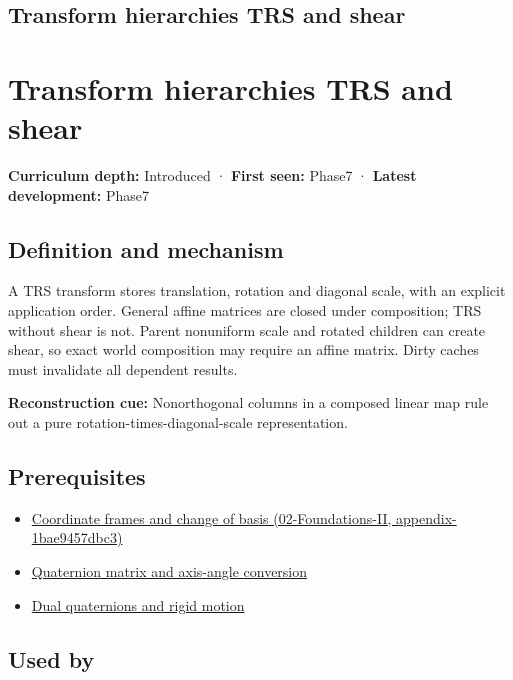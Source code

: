 \hypertarget{appendix-292c061cd47c}{}
\section*{Transform hierarchies TRS and shear}
\chapter{Transform hierarchies TRS and shear}\label{appendix-292c061cd47c-transform-hierarchies-trs-and-shear}

\textbf{Curriculum depth:} Introduced · \textbf{First seen:} Phase7 · \textbf{Latest development:} Phase7

\section{Definition and mechanism}\label{appendix-292c061cd47c-definition-and-mechanism}

A TRS transform stores translation, rotation and diagonal scale, with an explicit application order. General affine matrices are closed under composition; TRS without shear is not. Parent nonuniform scale and rotated children can create shear, so exact world composition may require an affine matrix. Dirty caches must invalidate all dependent results.

\textbf{Reconstruction cue:} Nonorthogonal columns in a composed linear map rule out a pure rotation-times-diagonal-scale representation.

\section{Prerequisites}\label{appendix-292c061cd47c-prerequisites}

\begin{itemize}
\tightlist
\item
  \href{../02-Foundations-II/main.pdf\#nameddest=appendix-1bae9457dbc3}{Coordinate frames and change of basis (02-Foundations-II, appendix-1bae9457dbc3)}
\item
  \hyperref[appendix-26d8da71f6c4]{Quaternion matrix and axis-angle conversion}
\item
  \hyperref[appendix-d1ea57347893]{Dual quaternions and rigid motion}
\end{itemize}

\section{Used by}\label{appendix-292c061cd47c-used-by}

